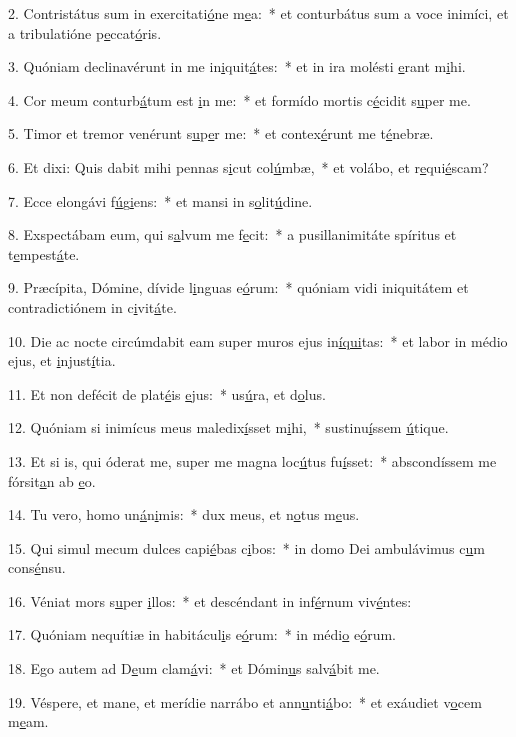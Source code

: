 2. Contristátus sum in exercitati\uline{ó}ne m\uline{e}a:~* et conturbátus sum a voce inimíci, et a tribulatióne p\uline{e}ccat\uline{ó}ris.\par 
3. Quóniam declinavérunt in me in\uline{i}quit\uline{á}tes:~* et in ira molésti \uline{e}rant m\uline{i}hi.\par 
4. Cor meum conturb\uline{á}tum est \uline{i}n me:~* et formído mortis c\uline{é}cidit s\uline{u}per me.\par 
5. Timor et tremor venérunt s\uline{u}p\uline{e}r me:~* et contex\uline{é}runt me t\uline{é}nebræ.\par 
6. Et dixi: Quis dabit mihi pennas s\uline{i}cut col\uline{ú}mbæ,~* et volábo, et r\uline{e}qui\uline{é}scam?\par 
7. Ecce elongávi f\uline{ú}g\uline{i}ens:~* et mansi in s\uline{o}lit\uline{ú}dine.\par 
8. Exspectábam eum, qui s\uline{a}lvum me f\uline{e}cit:~* a pusillanimitáte spíritus et t\uline{e}mpest\uline{á}te.\par 
9. Præcípita, Dómine, dívide l\uline{i}nguas e\uline{ó}rum:~* quóniam vidi iniquitátem et contradictiónem in c\uline{i}vit\uline{á}te.\par 
10. Die ac nocte circúmdabit eam super muros ejus in\uline{í}\uline{qui}tas:~* et labor in médio ejus, et \uline{i}njust\uline{í}tia.\par 
11. Et non defécit de plat\uline{é}is \uline{e}jus:~* us\uline{ú}ra, et d\uline{o}lus.\par 
12. Quóniam si inimícus meus maledix\uline{í}sset m\uline{i}hi,~* sustinu\uline{í}ssem \uline{ú}tique.\par 
13. Et si is, qui óderat me, super me magna loc\uline{ú}tus fu\uline{í}sset:~* abscondíssem me fórsit\uline{a}n ab \uline{e}o.\par 
14. Tu vero, homo un\uline{á}n\uline{i}mis:~* dux meus, et n\uline{o}tus m\uline{e}us.\par 
15. Qui simul mecum dulces capi\uline{é}bas c\uline{i}bos:~* in domo Dei ambulávimus c\uline{u}m cons\uline{é}nsu.\par 
16. Véniat mors s\uline{u}per \uline{i}llos:~* et descéndant in inf\uline{é}rnum viv\uline{é}ntes:\par 
17. Quóniam nequítiæ in habitácul\uline{i}s e\uline{ó}rum:~* in médi\uline{o} e\uline{ó}rum.\par 
18. Ego autem ad D\uline{e}um clam\uline{á}vi:~* et Dómin\uline{u}s salv\uline{á}bit me.\par 
19. Véspere, et mane, et merídie narrábo et ann\uline{u}nti\uline{á}bo:~* et exáudiet v\uline{o}cem m\uline{e}am.\par 
